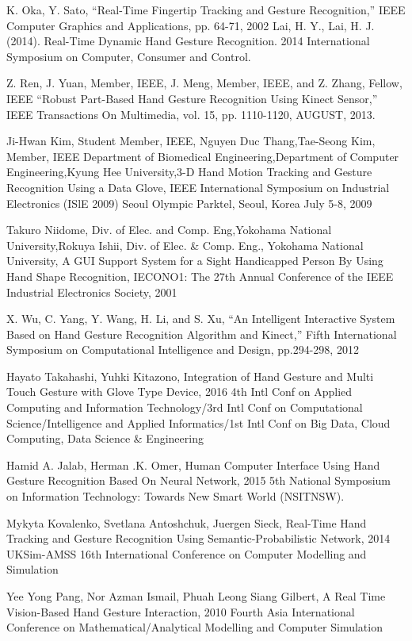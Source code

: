 \documentclass[11pt]{report}
\begin{document}
\begin{thebibliography}{999}

     K. Oka, Y. Sato, “Real-Time Fingertip Tracking and Gesture Recognition,” IEEE Computer Graphics and Applications, pp. 64-71, 2002
     Lai, H. Y., Lai, H. J. (2014). Real-Time Dynamic Hand Gesture Recognition. 2014 International Symposium on Computer, Consumer and Control. 
    
     Z. Ren, J. Yuan, Member, IEEE, J. Meng, Member, IEEE, and Z. Zhang, Fellow, IEEE “Robust Part-Based Hand Gesture Recognition Using Kinect Sensor,” IEEE Transactions On Multimedia, vol. 15, pp. 1110-1120, AUGUST, 2013.
    
     Ji-Hwan Kim, Student Member, IEEE, Nguyen Duc Thang,Tae-Seong Kim, Member, IEEE Department of Biomedical Engineering,Department of Computer Engineering,Kyung Hee University,3-D Hand Motion Tracking and Gesture Recognition
    Using a Data Glove, IEEE International Symposium on Industrial Electronics (ISlE 2009) Seoul Olympic Parktel, Seoul, Korea July 5-8, 2009
    
     Takuro Niidome, Div. of Elec. and Comp. Eng,Yokohama National University,Rokuya Ishii, Div. of Elec. \& Comp. Eng., Yokohama National University, A GUI Support System for a Sight Handicapped Person By Using Hand Shape Recognition, IECONO1: The 27th Annual Conference of the IEEE Industrial Electronics Society, 2001
    
     X. Wu, C. Yang, Y. Wang, H. Li, and S. Xu, “An Intelligent Interactive System Based on Hand Gesture Recognition Algorithm and Kinect,” Fifth International Symposium on Computational Intelligence and Design, pp.294-298, 2012
    
     Hayato Takahashi, Yuhki Kitazono, Integration of Hand Gesture and Multi Touch Gesture with Glove Type Device, 2016 4th Intl Conf on Applied Computing and Information Technology/3rd Intl Conf on Computational Science/Intelligence and Applied Informatics/1st Intl Conf on Big Data, Cloud Computing, Data Science \& Engineering
    
     Hamid A. Jalab, Herman .K. Omer, Human Computer Interface Using Hand Gesture Recognition Based On Neural Network, 2015 5th National Symposium on Information Technology: Towards New Smart World (NSITNSW).
    
     Mykyta Kovalenko, Svetlana Antoshchuk, Juergen Sieck, Real-Time Hand Tracking and Gesture Recognition Using Semantic-Probabilistic Network, 2014 UKSim-AMSS 16th International Conference on Computer Modelling and Simulation
    
     Yee Yong Pang, Nor Azman Ismail, Phuah Leong Siang Gilbert, A Real Time Vision-Based Hand Gesture Interaction, 2010 Fourth Asia International Conference on Mathematical/Analytical Modelling and Computer Simulation
    



\end{thebibliography}
\end{document}
